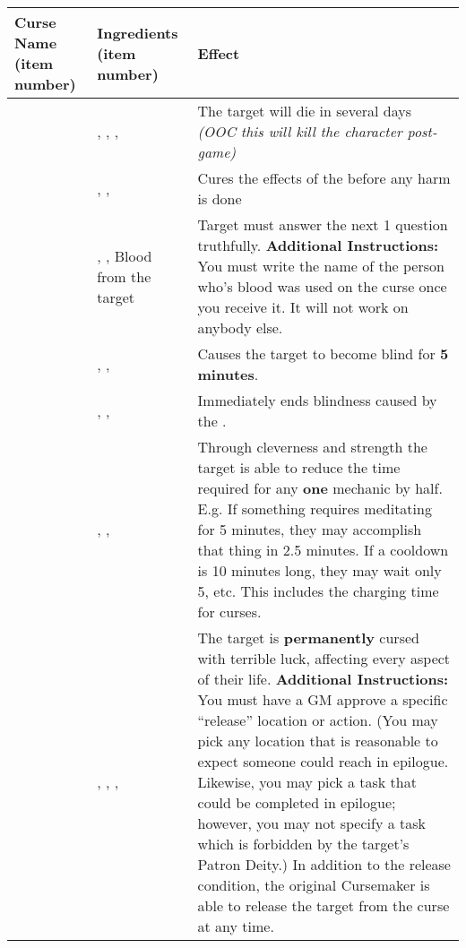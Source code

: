 \documentclass[green]{GL2020}
\begin{document}
\begin{tabularx}{\textwidth}{| >{\centering\arraybackslash} m{3cm} | >{\centering\arraybackslash} m{5cm} | X |}
\hline
	\textbf{Curse Name (item number)} & \textbf{Ingredients (item number)}  & \textbf{Effect} \\
\hline
\hline
	\iSlowActingPoison{}	&	\iWeakness{}, \iRestraint{}, \iFish{}, \iFlameOrchid{} & The target will die in several days \emph{(OOC this will kill the character post-game)}\\
\hline	
	\iSlowActingPoisonCure{}	&	\iCourage{}, \iLily{}, \iStoneFlower{} & Cures the effects of the \iSlowActingPoison{} before any harm is done\\
\hline	
	\iHonesty{}	&	\iInsight{}, \iHollyhock{}, Blood from the target & Target must answer the next 1 question truthfully. \textbf{Additional Instructions: } You must write the name of the person who's blood was used on the curse once you receive it. It will not work on anybody else.\\
\hline	
	\iBlindness{}	&	\iRestraint{}, \iMorningGlory{}, \iClay{} & Causes the target to become blind for \textbf{5 minutes}.\\
\hline	
	\iSight{}	&	\iCourage{}, \iEagleFeather{}, \iSunflower{} & Immediately ends blindness caused by the \iBlindness{}.\\
\hline	
	\iSkill{}	&	\iStrength{}, \iBlackCrocus{}, \iLimestone{} & Through cleverness and strength the target is able to reduce the time required for any \textbf{one} mechanic by half. E.g. If something requires meditating for 5 minutes, they may accomplish that thing in 2.5 minutes. If a cooldown is 10 minutes long, they may wait only 5, etc. This includes the charging time for curses.\\
\hline	
	\iBadLuckCurse{}	&	\iWeakness{}, \iBabble{}, \iBlackCrocus{}, \iCharcoal{} & The target is \textbf{permanently} cursed with terrible luck, affecting every aspect of their life. \textbf{Additional Instructions:} You must have a GM approve a specific ``release'' location or action. (You may pick any location that is reasonable to expect someone could reach in epilogue. Likewise, you may pick a task that could be completed in epilogue; however, you may not specify a task which is forbidden by the target’s Patron Deity.) In addition to the release condition, the original Cursemaker is able to release the target from the curse at any time.\\
\hline	
\end{tabularx}
\end{document}
